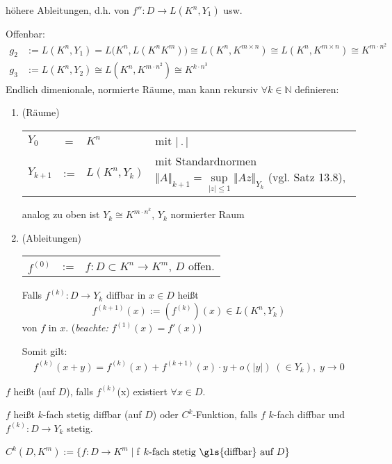 \begin{underlinedenvironment}[Frage]
	höhere Ableitungen, d.h. von $f'':D\to L(K^n, Y_1)$ usw.
	
	Offenbar: \begin{align*}
		g_2&:= L(K^n, Y_1) = L\big(K^n, L(K^n K^m)\big) \cong L(K^n, K^{m\times n}) \cong L(K^n, K^{m\times n}) \cong K^{m\cdot n^2}\\
		g_3&:= L(K^n, Y_2) \cong L(K^n, K^{m\cdot n^2}) \cong K^{k\cdot n^3}
	\end{align*}
	Endlich dimenionale, normierte Räume, man kann rekursiv $\forall k\in \mathbb{N}$ definieren: \begin{enumerate}[label={(\roman*)}]
		\item (Räume)
		
		\begin{tabularx}{\linewidth}{l@{\ }c@{\ }l@{\ }X}
			$Y_0$ & = & $K^n$ &  mit $\vert\,.\,\vert$ \\
			$Y_{k+1}$ &  :=  & $L(K^n, Y_k)$ & mit Standardnormen $\Vert A\Vert_{k+1} = \sup\limits_{\vert z \vert \le 1} \Vert Az\Vert_{Y_k}$ (vgl. Satz 13.8),
		\end{tabularx}
		analog zu oben ist $Y_k\cong K^{m\cdot n^k}$, $Y_k$ normierter Raum
		
		\item (Ableitungen)
		
		\begin{tabularx}{\linewidth}{l@{\ }c@{\ }X}
			$f^{(0)}$ & := & $f:D\subset K^n\to K^m$, $D$ offen.\\
		\end{tabularx}
		Falls $f^{(k)}:D\to Y_k$ \gls{diffbar} in $x\in D$ heißt \[ f^{(k+1)}(x) := \left( f^{(k)} \right) (x)\in L(K^n, Y_k)  \]
		 von $f$ in $x$. (\emph{beachte:} $f^{(1)}(x) = f'(x)$)
		
		Somit gilt: \begin{align}
			f^{(k)} (x + y) = f^{(k)}(x) + f^{(k+1)}(x) \cdot y + o(\vert y \vert) \;(\in Y_k), \;y\to 0
		\end{align}
	\end{enumerate}
\end{underlinedenvironment}

\begin{*definition}
	$f$ heißt  (auf $D$), falls $f^{(k)}$(x) existiert $\forall x\in D$.
	
	$f$ heißt $k$-fach stetig \gls{diffbar} (auf $D$) oder $C^k$-Funktion, falls $f$ $k$-fach \gls{diffbar} und $f^{(k)}:D\to Y_k$ stetig.
	
	$C^k(D, K^m) := \{ f:D\to K^m\mid $f$ \text{ $k$-fach stetig \gls{diffbar} auf $D$} \}$
\end{*definition}

